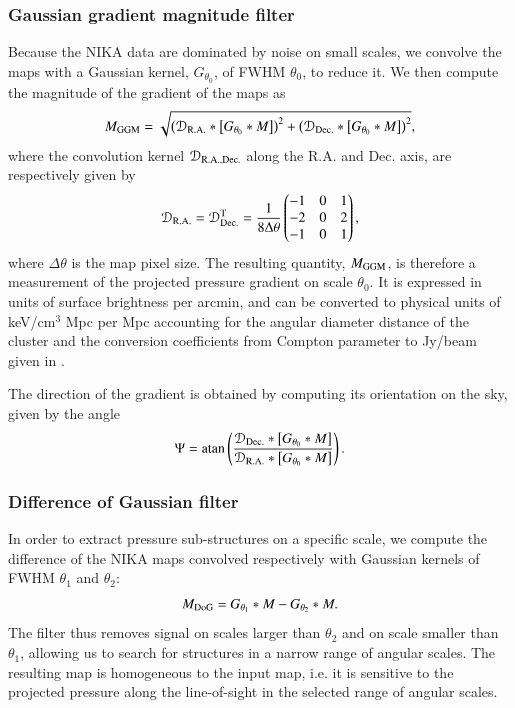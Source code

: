 \documentclass[twocolumn,traditabstract]{aa}
\begin{document}
\subsubsection{Gaussian gradient magnitude filter}
Because the NIKA data are dominated by noise on small scales, we convolve the maps with a Gaussian kernel, $G_{\theta_0}$, of FWHM $\theta_0$, to reduce it. We then compute the magnitude of the gradient of the maps as 
\begin{equation}
	M_{\rm GGM} = \sqrt{\left(\mathcal{D}_{\rm R.A.} \ast \left[G_{\theta_0} \ast M\right]\right)^2 + \left(\mathcal{D}_{\rm Dec.} \ast \left[G_{\theta_0} \ast M\right]\right)^2},
	\label{eq:GGM_filter}
\end{equation}
where the convolution kernel $\mathcal{D}_{\rm R.A., Dec.}$ along the R.A. and Dec. axis, are respectively given by
\begin{equation}
	\mathcal{D}_{\rm R.A.}= \mathcal{D}_{\rm Dec.}^{\rm T} = \frac{1}{8 \Delta \theta}
	\begin{pmatrix}
	-1 & 0 & 1\\
	-2 & 0 & 2\\
	-1 & 0 & 1
	\end{pmatrix},
	\label{eq:GGM_kernel}
\end{equation}
where $\Delta \theta$ is the map pixel size. The resulting quantity, $M_{\rm GGM}$, is therefore a measurement of the projected pressure gradient on scale $\theta_0$. It is expressed in units of surface brightness per arcmin, and can be converted to physical units of keV/cm$^3$ Mpc per Mpc accounting for the angular diameter distance of the cluster and the conversion coefficients from Compton parameter to Jy/beam given in \cite{Adam2016b}.

The direction of the gradient is obtained by computing its orientation on the sky, given by the angle
\begin{equation}
	\Psi = {\rm atan} \left( \frac{\mathcal{D}_{\rm Dec.} \ast \left[G_{\theta_0} \ast M\right]}{\mathcal{D}_{\rm R.A.} \ast \left[G_{\theta_0} \ast M\right]} \right).
	\label{eq:GGM_angle}
\end{equation}

\subsubsection{Difference of Gaussian filter}
In order to extract pressure sub-structures on a specific scale, we compute the difference of the NIKA maps convolved respectively with Gaussian kernels of FWHM $\theta_1$ and $\theta_2$:
\begin{equation}
	M_{\rm DoG} = G_{\theta_1} \ast M - G_{\theta_2} \ast M.
	\label{eq:DoG_filter}
\end{equation}
The filter thus removes signal on scales larger than $\theta_2$ and on scale smaller than $\theta_1$, allowing us to search for structures in a narrow range of angular scales. The resulting map is homogeneous to the input map, i.e. it is sensitive to the projected pressure along the line-of-sight in the selected range of angular scales.
\end{document}
